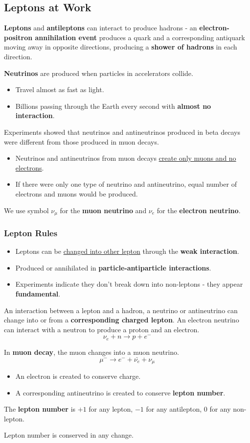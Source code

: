 \subsection{Leptons at Work}

\textbf{Leptons} and \textbf{antileptons} can interact to produce hadrons - an \textbf{electron-positron annihilation event} produces a quark and a corresponding antiquark moving away in opposite directions, producing a \textbf{shower of hadrons} in each direction.

\textbf{Neutrinos} are produced when particles in accelerators collide.
\begin{itemize}
    \item Travel almost as fast as light.
    \item Billions passing through the Earth every second with \textbf{almost no interaction}.
\end{itemize}

Experiments showed that neutrinos and antineutrinos produced in beta decays were different from those produced in muon decays.
\begin{itemize}
    \item Neutrinos and antineutrinos from muon decays \underline{create only muons and no electrons}.
    \item If there were only one type of neutrino and antineutrino, equal number of electrons and muons would be produced.
\end{itemize}
We use symbol $\nu_\mu$ for the \textbf{muon neutrino} and $\nu_e$ for the \textbf{electron neutrino}.

\subsubsection*{Lepton Rules}

\begin{itemize}
    \item Leptons can be \underline{changed into other lepton} through the \textbf{weak interaction}.
    \item Produced or annihilated in \textbf{particle-antiparticle interactions}.
    \item Experiments indicate they don't break down into non-leptons - they appear \textbf{fundamental}.
\end{itemize}

An interaction between a lepton and a hadron, a neutrino or antineutrino can change into or from a \textbf{corresponding charged lepton}. An electron neutrino can interact with a neutron to produce a proton and an electron.
$$\nu_e+n\to p+e^-$$

In \textbf{muon decay}, the muon changes into a muon neutrino.
$$\mu^-\to e^-+\bar{\nu_e}+\nu_\mu$$
\begin{itemize}
    \item An electron is created to conserve charge.
    \item A corresponding antineutrino is created to conserve \textbf{lepton number}.
\end{itemize}

The \textbf{lepton number} is $+1$ for any lepton, $-1$ for any antilepton, 0 for any non-lepton.

Lepton number is conserved in any change.
